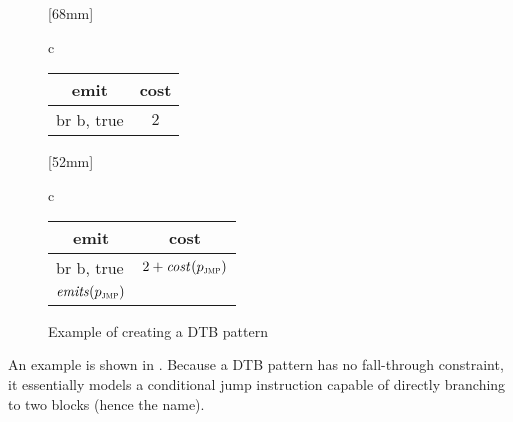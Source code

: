 \begin{figure}
                [68mm]%
                {%
                  \begin{tabular}{c}
                    \\[.5\betweensubfigures]
                    \figureFont\figureFontSize%
                    \begin{tabular}{lc}
                      \toprule
                        \multicolumn{1}{c}{\tabhead emit} & \tabhead cost\\
                      \midrule
                        {\instrFont br b, true} & $2$\\
                      \bottomrule
                    \end{tabular}%
                  \end{tabular}%
                }%
  \hfill%
                [52mm]%
                {%
                  \begin{tabular}{c}
                    \newcommand{\fallthruString}{}%
                    \\[.5\betweensubfigures]
                    \figureFont\figureFontSize%
                    \begin{tabular}{lc}
                      \toprule
                        \multicolumn{1}{c}{\tabhead emit} & \tabhead cost\\
                      \midrule
                        {\instrFont br b, true}
                      & $2 + \operatorname{\textrm{\textit{cost}}}\hspace{.4pt}(p_{\textsc{jmp}})$\\
                        $\operatorname{\textrm{\textit{emits}}}(p_{\textsc{jmp}})$
                      & \\
                      \bottomrule
                    \end{tabular}%
                  \end{tabular}%
                }

  \caption{Example of creating a DTB pattern}%
\end{figure}
%
An example is shown in .
%
Because a \gls{DTB pattern} has no \gls{fall-through} \gls{constraint}, it
essentially models a conditional jump \gls{instruction} capable of directly
branching to two \glspl{block} (hence the name).

